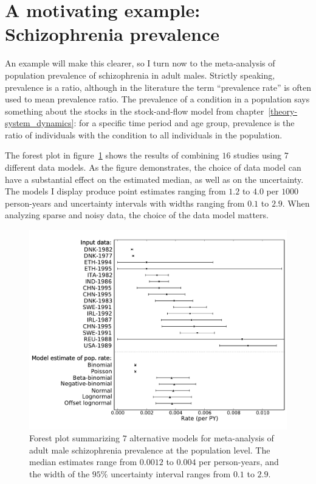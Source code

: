 \section{A motivating example: Schizophrenia prevalence}
An example will make this clearer, so I turn now to the meta-analysis
of population prevalence of schizophrenia in adult males.  Strictly
speaking, prevalence is a ratio, although in the
literature the term ``prevalence rate'' is often used to mean
prevalence ratio.  The prevalence of a condition in a population says
something about the stocks in the stock-and-flow model from
chapter~\ref{theory-system_dynamics}: for a specific time period and
age group, prevalence is the ratio of individuals with the condition
to all individuals in the population.

The forest plot in figure~\ref{rate-model-schiz-forest} shows the
results of combining $16$ studies using $7$ different data models.  As
the figure demonstrates, the choice of data model can have a
substantial effect on the estimated median, as well as on the uncertainty. The models I
display produce point estimates ranging from $1.2$ to $4.0$ per
$1000$ person-years and uncertainty intervals with widths ranging from $0.1$ to
$2.9$.  When analyzing sparse and noisy data, the choice of the data model
matters.

\begin{figure}[h]
\begin{center}
\includegraphics[width=\textwidth]{schiz_forest.pdf}
\caption[Forest plot of $7$ alternative models for meta-analysis of schizophrenia.]{Forest
  plot summarizing $7$ alternative models for
  meta-analysis of adult male schizophrenia prevalence at the
  population level.  The median estimates range from
  $0.0012$ to
  $0.004$ per person-years, and the width of the
  $95\%$ uncertainty interval ranges from
  $0.1$ to
  $2.9$.}
\label{rate-model-schiz-forest}
\end{center}
\end{figure}

